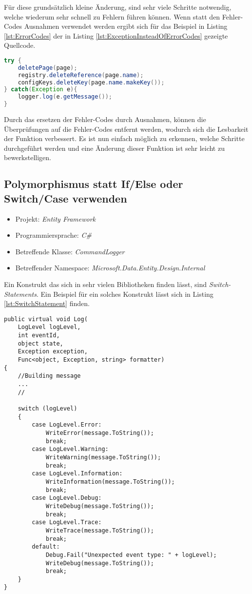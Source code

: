 \SuperPar Für diese grundsätzlich kleine Änderung, sind sehr viele Schritte notwendig, welche wiederum sehr schnell zu Fehlern führen können. Wenn statt den Fehler-Codes Ausnahmen verwendet werden ergibt sich für das Beispiel in Listing \ref{lst:ErrorCodes} der in Listing \ref{lst:ExceptionInsteadOfErrorCodes} gezeigte Quellcode.

\begin{lstlisting}[language={Java}, caption=Beispiel für die Verwendung von Ausnahmen statt Fehler-Codes, label=lst:ExceptionInsteadOfErrorCodes]
try {
    deletePage(page);
    registry.deleteReference(page.name);
    configKeys.deleteKey(page.name.makeKey());
} catch(Exception e){
    logger.log(e.getMessage());
}
\end{lstlisting}

\SuperPar Durch das ersetzen der Fehler-Codes durch Ausnahmen, können die Überprüfungen auf die Fehler-Codes entfernt werden, wodurch sich die Lesbarkeit der Funktion verbessert. Es ist nun einfach möglich zu erkennen, welche Schritte durchgeführt werden und eine Änderung dieser Funktion ist sehr leicht zu bewerkstelligen. 

\subsection{Polymorphismus statt If/Else oder Switch/Case verwenden}
\begin{itemize}
	\item Projekt: \textit{Entity Framework}
	\item Programmiersprache: \textit{C\#}
	\item Betreffende Klasse: \textit{CommandLogger }
	\item Betreffender Namespace: \textit{Microsoft.Data.Entity.Design.Internal}
\end{itemize}
\SuperPar Ein Konstrukt das sich in sehr vielen Bibliotheken finden lässt, sind \textit{Switch-Statements}. Ein Beispiel für ein solches Konstrukt lässt sich in  Listing \ref{lst:SwitchStatement} finden.

\begin{lstlisting}[language={[Sharp]C}, caption=Beispiel für Switch Statement, label=lst:SwitchStatement]
public virtual void Log(
	LogLevel logLevel,
	int eventId,
	object state,
	Exception exception,
	Func<object, Exception, string> formatter)
{
	//Building message
	...
	//

	switch (logLevel)
	{
		case LogLevel.Error:
			WriteError(message.ToString());
			break;
		case LogLevel.Warning:
			WriteWarning(message.ToString());
			break;
		case LogLevel.Information:
			WriteInformation(message.ToString());
			break;
		case LogLevel.Debug:
			WriteDebug(message.ToString());
			break;
		case LogLevel.Trace:
			WriteTrace(message.ToString());
			break;
		default:
			Debug.Fail("Unexpected event type: " + logLevel);
			WriteDebug(message.ToString());
			break;
	}
}
\end{lstlisting}

